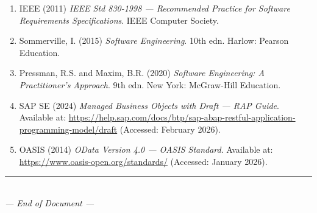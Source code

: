 \documentclass[12pt,a4paper]{report}
\begin{document}
\begin{enumerate}[leftmargin=2em]
  \item IEEE (2011) \textit{IEEE Std 830-1998 --- Recommended Practice for Software Requirements Specifications}. IEEE Computer Society.

  \item Sommerville, I. (2015) \textit{Software Engineering}. 10th edn. Harlow: Pearson Education.

  \item Pressman, R.S. and Maxim, B.R. (2020) \textit{Software Engineering: A Practitioner's Approach}. 9th edn. New York: McGraw-Hill Education.

  \item SAP SE (2024) \textit{Managed Business Objects with Draft --- RAP Guide}. Available at: \url{https://help.sap.com/docs/btp/sap-abap-restful-application-programming-model/draft} (Accessed: February 2026).

  \item OASIS (2014) \textit{OData Version 4.0 --- OASIS Standard}. Available at: \url{https://www.oasis-open.org/standards/} (Accessed: January 2026).

\end{enumerate}



\vfill
\begin{center}
\rule{0.5\textwidth}{0.4pt}\\[6pt]
\textit{--- End of Document ---}
\end{center}
\end{document}
